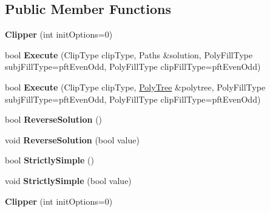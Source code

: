 \subsection*{Public Member Functions}
\begin{DoxyCompactItemize}
\item 
\mbox{\label{classClipperLib_1_1Clipper_adceb8536f6a80e8f115213dba9208427}} 
{\bfseries Clipper} (int init\+Options=0)
\item 
\mbox{\label{classClipperLib_1_1Clipper_a06da196a4b4151edd2e5426ed48744cf}} 
bool {\bfseries Execute} (Clip\+Type clip\+Type, Paths \&solution, Poly\+Fill\+Type subj\+Fill\+Type=pft\+Even\+Odd, Poly\+Fill\+Type clip\+Fill\+Type=pft\+Even\+Odd)
\item 
\mbox{\label{classClipperLib_1_1Clipper_aceb19a1e5a5c9e31067f4d1177793403}} 
bool {\bfseries Execute} (Clip\+Type clip\+Type, \hyperlink{classClipperLib_1_1PolyTree}{Poly\+Tree} \&polytree, Poly\+Fill\+Type subj\+Fill\+Type=pft\+Even\+Odd, Poly\+Fill\+Type clip\+Fill\+Type=pft\+Even\+Odd)
\item 
\mbox{\label{classClipperLib_1_1Clipper_ad556ba9961f498de02d55dc95bc5a889}} 
bool {\bfseries Reverse\+Solution} ()
\item 
\mbox{\label{classClipperLib_1_1Clipper_a44afc0c82a1d2607829b5fd21f7644ef}} 
void {\bfseries Reverse\+Solution} (bool value)
\item 
\mbox{\label{classClipperLib_1_1Clipper_a50eb4c514466ed37fd365769e0bcf67b}} 
bool {\bfseries Strictly\+Simple} ()
\item 
\mbox{\label{classClipperLib_1_1Clipper_a85aa82d75e0d7d1f380d2e96231d6aa3}} 
void {\bfseries Strictly\+Simple} (bool value)
\item 
\mbox{\label{classClipperLib_1_1Clipper_adceb8536f6a80e8f115213dba9208427}} 
{\bfseries Clipper} (int init\+Options=0)
\item 
\mbox{\label{classClipperLib_1_1Clipper_a06da196a4b4151edd2e5426ed48744cf}} 

\end{DoxyCompactItemize}

